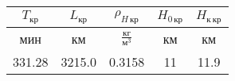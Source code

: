 \begin{tabular}{|c|c|c|c|c|}
\hline
$T_{кр}$ & $L_{кр}$ & $\rho_{H\, кр}$ & $H_{0\, кр}$ & $H_{к\, кр}$ \\ 
\hline
мин & км & $\frac{кг}{м^3}$ & км & км \\ 
\hline
331.28 & 3215.0 & 0.3158 & 11 & 11.9 \\ 
\hline
\end{tabular}